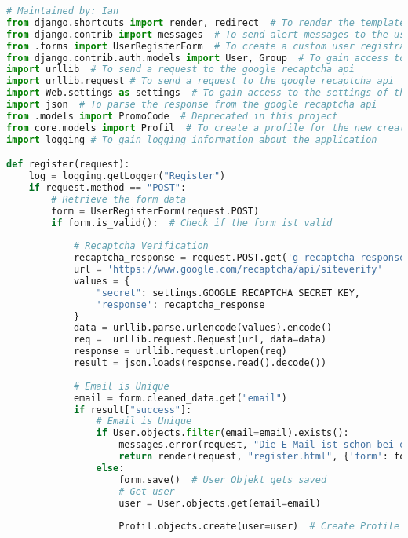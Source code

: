 \begin{lstlisting}[language=Python]
# Maintained by: Ian
from django.shortcuts import render, redirect  # To render the template and redirect to another page
from django.contrib import messages  # To send alert messages to the user
from .forms import UserRegisterForm  # To create a custom user registration form
from django.contrib.auth.models import User, Group  # To gain access to the django internal user and group model
import urllib  # To send a request to the google recaptcha api
import urllib.request # To send a request to the google recaptcha api
import Web.settings as settings  # To gain access to the settings of the app
import json  # To parse the response from the google recaptcha api
from .models import PromoCode  # Deprecated in this project
from core.models import Profil  # To create a profile for the new created user -> Database
import logging # To gain logging information about the application

def register(request):
    log = logging.getLogger("Register")
    if request.method == "POST":
        # Retrieve the form data
        form = UserRegisterForm(request.POST)
        if form.is_valid():  # Check if the form ist valid
            
            # Recaptcha Verification
            recaptcha_response = request.POST.get('g-recaptcha-response')
            url = 'https://www.google.com/recaptcha/api/siteverify'
            values = {
                "secret": settings.GOOGLE_RECAPTCHA_SECRET_KEY,
                'response': recaptcha_response
            }
            data = urllib.parse.urlencode(values).encode()
            req =  urllib.request.Request(url, data=data)
            response = urllib.request.urlopen(req)
            result = json.loads(response.read().decode())
            
            # Email is Unique
            email = form.cleaned_data.get("email")
            if result["success"]:
                # Email is Unique
                if User.objects.filter(email=email).exists():
                    messages.error(request, "Die E-Mail ist schon bei einem anderen Account verwendet worden.")
                    return render(request, "register.html", {'form': form})
                else:
                    form.save()  # User Objekt gets saved
                    # Get user
                    user = User.objects.get(email=email)
                    
                    Profil.objects.create(user=user)  # Create Profile for the new created user.
                    

\end{lstlisting}
